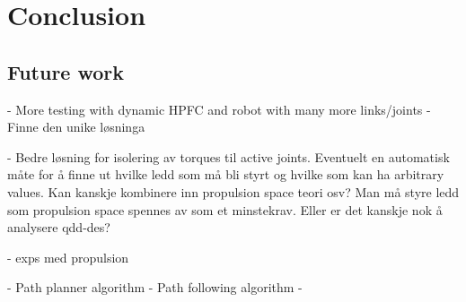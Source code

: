 \chapter{Conclusion}\label{ch:conclusion}


\section{Future work}

- More testing with dynamic HPFC and robot with many more links/joints
- Finne den unike løsninga

- Bedre løsning for isolering av torques til active joints. Eventuelt en automatisk måte for å finne ut hvilke ledd som må bli styrt og hvilke som kan ha arbitrary values. Kan kanskje kombinere inn propulsion space teori osv? Man må styre ledd som propulsion space spennes av som et minstekrav.
Eller er det kanskje nok å analysere qdd-des?

- exps med propulsion

- Path planner algorithm
- Path following algorithm
- 